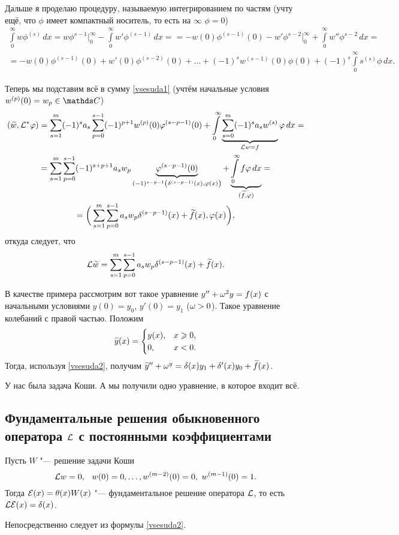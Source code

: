 Дальше я проделаю процедуру, называемую интегрированием по частям (учту ещё, что $\phi$ имеет компактный носитель, то есть на $\infty$ $\phi=0$)
\begin{multline*}
  \int\limits_0^\infty w\phi^{(s)}\,dx = w \phi^{s-1}\bigg|_0^\infty - \int\limits_0^\infty w'\phi^{(s-1)}\,dx = 
  = - w(0)\phi^{(s-1)}(0)-w'\phi^{s-2}\bigg|_0^\infty + \int\limits_0^\infty w''\phi^{s-2}\,dx = \\
  = -w(0) \phi^{(s-1)}(0)+w'(0) \phi^{(s-2)}(0)+\dots + (-1)^s w^{(s-1)}(0)\phi(0) + (-1)^s\int\limits_0^\infty s^{(s)}\phi\,dx.
\end{multline*}

Теперь мы подставим всё в сумму \eqref{vsesuda1} (учтём начальные условия $w^{(p)}(0) = w_p\in\C$)
\begin{multline*}
   (\widetilde{w}{},\mathcal L^*\varphi)  = \sum\limits_{s = 1}^{m}(-1)^sa_s\sum\limits_{p = 0}^{s-1}(-1)^{p+1} w^{(p)}(0)\varphi^{(s-p-1)}(0) + \int\limits_0^\infty \underbrace{\sum\limits_{s = 0}^{m}(-1)^sa_sw^{(s)}}_{\mathcal L w = f}\varphi\,dx = \\
  = \sum\limits_{s = 1}^{m}\sum\limits_{p = 0}^{s-1}(-1)^{s+p+1}a_s w_p\underbrace{\varphi^{(s-p-1)}(0)}_{(-1)^{s-p-1}\left(\delta^{(s-p-1)}(x),\varphi(x)\right)}+\underbrace{\int\limits_0^{\infty} f\varphi\,dx}_{(\widetilde{f}{},\varphi)} =\\
  =\bigg(\sum\limits_{s = 1}^{m} \sum\limits_{p = 0}^{s-1} a_s w_p \delta^{(s-p-1)}(x)+\widetilde{f}{}(x),\varphi(x)\bigg),
\end{multline*}
откуда следует, что
\begin{equation}\label{vsesuda2}
  \mathcal L\widetilde{w}{} = \sum\limits_{s = 1}^{m}\sum\limits_{p = 0}^{s-1} a_sw_p\delta^{(s-p-1)}(x) + \widetilde{f}{}(x).
\end{equation}

В качестве примера рассмотрим вот такое уравнение $y'' + \omega^2 y = f(x)$ с начальными условиями $y(0)=y_0$, $y'(0)= y_1$ ($\omega>0$). Такое уравнение колебаний с правой частью. Положим
\[
  \widetilde{y}{}(x) = \begin{cases}y(x),&x\geqslant0,\\ 0,&x<0.\end{cases}
\]
Тогда, используя \eqref{vsesuda2}, получим $\widetilde{y}{}''+ \omega^y=\delta(x) y_1 +\delta'(x)y_0+\widetilde{f}{}(x)$.

У нас была задача Коши. А мы получили одно уравнение, в которое входит всё.

\subsection{Фундаментальные решения обыкновенного оператора $\mathcal L$ с постоянными коэффициентами}
\begin{The}
  Пусть $W$ "--- решение задачи Коши
  \[
  \mathcal L w = 0,\hskip .75em plus.1em minus.08em\relax w(0)=0,\dots, w^{(m-2)}(0)=0,\  w^{(m-1)}(0)=1.
\]
Тогда $\mathcal E(x) = \theta(x)W(x)$ "--- фундаментальное решение оператора $\mathcal L$, то есть $\mathcal L\mathcal E(x)=\delta(x)$.
\end{The}
\begin{Proof}
  Непосредственно следует из формулы \eqref{vsesuda2}.
\end{Proof}

